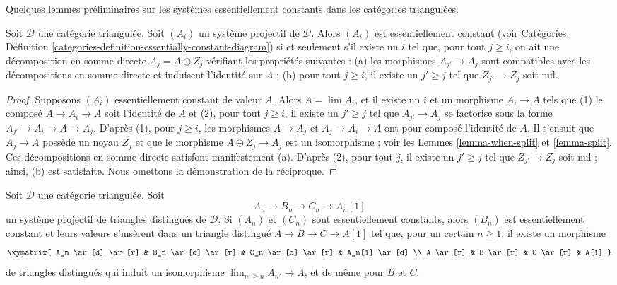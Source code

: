\noindent
Quelques lemmes préliminaires sur les systèmes essentiellement constants
dans les catégories triangulées.

\begin{lemma}
\label{lemma-essentially-constant}
Soit $\mathcal{D}$ une catégorie triangulée. Soit $(A_i)$ un système
projectif de $\mathcal{D}$. Alors $(A_i)$ est essentiellement constant (voir
Catégories, Définition
\ref{categories-definition-essentially-constant-diagram}) si et seulement
s'il existe un $i$ tel que, pour tout $j \geq i$, on ait une décomposition en
somme directe $A_j = A \oplus Z_j$ vérifiant les propriétés suivantes :
(a) les morphismes $A_{j'} \to A_j$ sont compatibles avec les décompositions
en somme directe et induisent l'identité sur $A$ ; (b) pour tout $j \geq i$,
il existe un $j' \geq j$ tel que $Z_{j'} \to Z_j$ soit nul.
\end{lemma}

\begin{proof}
Supposons $(A_i)$ essentiellement constant de valeur $A$. Alors
$A = \lim A_i$, et il existe un $i$ et un morphisme $A_i \to A$ tels que
(1) le composé $A \to A_i \to A$ soit l'identité de $A$ et (2), pour tout
$j \geq i$, il existe un $j' \geq j$ tel que $A_{j'} \to A_j$ se factorise
sous la forme $A_{j'} \to A_i \to A \to A_j$. D'après (1), pour
$j \geq i$, les morphismes $A \to A_j$ et $A_j \to A_i \to A$ ont pour
composé l'identité de $A$. Il s'ensuit que $A_j \to A$ possède un noyau
$Z_j$ et que le morphisme $A \oplus Z_j \to A_j$ est un isomorphisme ; voir
les Lemmes \ref{lemma-when-split} et \ref{lemma-split}.
Ces décompositions en somme directe satisfont manifestement (a).
D'après (2), pour tout $j$, il existe un $j' \geq j$ tel que
$Z_{j'} \to Z_j$ soit nul ; ainsi, (b) est satisfaite. Nous omettons la
démonstration de la réciproque.
\end{proof}

\begin{lemma}
\label{lemma-essentially-constant-2-out-of-3}
Soit $\mathcal{D}$ une catégorie triangulée. Soit
$$
A_n \to B_n \to C_n \to A_n[1]
$$
un système projectif de triangles distingués de $\mathcal{D}$.
Si $(A_n)$ et $(C_n)$ sont essentiellement constants, alors $(B_n)$ est
essentiellement constant et leurs valeurs s'insèrent dans un triangle
distingué $A \to B \to C \to A[1]$ tel que, pour un certain $n \geq 1$,
il existe un morphisme
$$
\xymatrix{
A_n \ar[d] \ar[r] &
B_n \ar[d] \ar[r] &
C_n \ar[d] \ar[r] &
A_n[1] \ar[d] \\
A \ar[r] &
B \ar[r] &
C \ar[r] &
A[1]
}
$$
de triangles distingués qui induit un isomorphisme
$\lim_{n' \geq n} A_{n'} \to A$, et de même pour $B$ et $C$.
\end{lemma}


